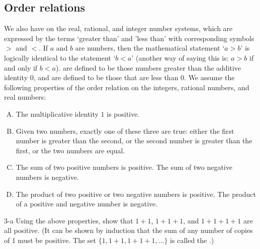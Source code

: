 

\subsection{Order relations}
\label{subsec:Preliminaries:OrderRelations}

We also have  on the real, rational, and integer number systems, which are expressed by the terms `greater than'  and 'less than' with corresponding symbols $>$ and $<$. If $a$ and $b$ are numbers, then  the mathematical statement `$a > b$' is logically identical to the statement  `$b<a$' (another way of saying this is: $a > b$ if and only if $b < a$).  are defined to be those numbers greater than the additive identity 0, and  are defined to be those that  are less than 0. We assume the following properties of the order relation on the integers, rational numbers, and real numbers:

\begin{enumerate}[(A)] 
\item
The multiplicative identity $1$ is positive.
\item
Given two numbers, exactly one of these three are true: either the first number is greater than the second, or the second number is greater than the first, or the two numbers are equal.
\item
The sum of two  positive numbers  is positive. The sum of two negative numbers is negative.
\item
The product of two  positive or two negative numbers is positive. The product of a positive and negative number is negative.
\end{enumerate}

\begin{exercise}{3-a}
Using the above properties, show that $1+1$, $1+1+1$, and $1+1+1+1$ are all positive. (It can be shown by induction that the sum of any number of copies of 1 must be positive. The set $\{1, 1+1, 1+1+1, \ldots\}$ is called the .)
\end{exercise}


